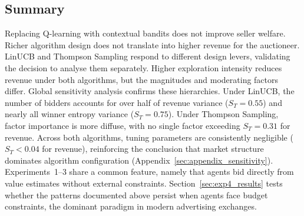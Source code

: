 \subsection{Summary}

Replacing Q-learning with contextual bandits does not improve seller welfare. Richer algorithm design does not translate into higher revenue for the auctioneer. LinUCB and Thompson Sampling respond to different design levers, validating the decision to analyse them separately. Higher exploration intensity reduces revenue under both algorithms, but the magnitudes and moderating factors differ. Global sensitivity analysis confirms these hierarchies. Under LinUCB, the number of bidders accounts for over half of revenue variance ($S_T = 0.55$) and nearly all winner entropy variance ($S_T = 0.75$). Under Thompson Sampling, factor importance is more diffuse, with no single factor exceeding $S_T = 0.31$ for revenue. Across both algorithms, tuning parameters are consistently negligible ($S_T < 0.04$ for revenue), reinforcing the conclusion that market structure dominates algorithm configuration (Appendix~\ref{sec:appendix_sensitivity}). Experiments~1--3 share a common feature, namely that agents bid directly from value estimates without external constraints. Section~\ref{sec:exp4_results} tests whether the patterns documented above persist when agents face budget constraints, the dominant paradigm in modern advertising exchanges.
